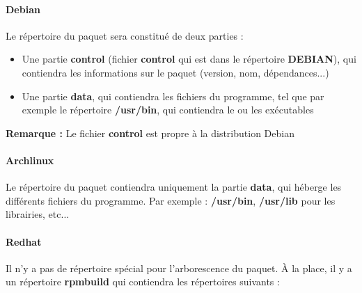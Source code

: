 \documentclass[12pt,a4paper]{article}
\newenvironment{remarque}{\textbf{Remarque :}}{}
\begin{document}
\paragraph{Debian} Le répertoire du paquet sera constitué de deux parties :
\begin{itemize}
	\item Une partie \textbf{control} (fichier \textbf{control} qui est dans le répertoire \textbf{DEBIAN}), qui contiendra les informations sur le paquet (version, nom, dépendances...)
	\item Une partie \textbf{data}, qui contiendra les fichiers du programme, tel que par exemple le répertoire \textbf{/usr/bin}, qui contiendra le ou les exécutables
\end{itemize}
\hspace{0.5cm} \begin{remarque} Le fichier \textbf{control} est propre à la distribution Debian\end{remarque}

\begin{figure}[!h]
	\centering
\end{figure}

\paragraph{Archlinux} Le répertoire du paquet contiendra uniquement la partie \textbf{data}, qui héberge les différents fichiers du programme. Par exemple : \textbf{/usr/bin}, \textbf{/usr/lib} pour les librairies, etc...

\begin{figure}[!h]
	\centering
\end{figure}

\paragraph{Redhat} Il n'y a pas de répertoire spécial pour l'arborescence du paquet. À la place, il y a un répertoire \textbf{rpmbuild} qui contiendra les répertoires suivants :
\end{document}
